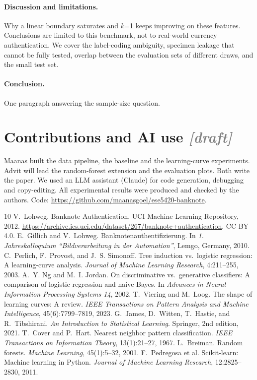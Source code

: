 \documentclass{article}
\newcommand{\todo}[1]{\textcolor{gray}{\textit{[#1]}}}
\begin{document}
\paragraph{Discussion and limitations.} Why a linear boundary saturates and $k$=1 keeps improving on these features. Conclusions are limited to this benchmark, not to real-world currency authentication. We cover the label-coding ambiguity, specimen leakage that cannot be fully tested, overlap between the evaluation sets of different draws, and the small test set.
\paragraph{Conclusion.} One paragraph answering the sample-size question.

\section*{Contributions and AI use \todo{draft}}
Maanas built the data pipeline, the baseline and the learning-curve experiments. Advit will lead the random-forest extension and the evaluation plots. Both write the paper. We used an LLM assistant (Claude) for code generation, debugging and copy-editing. All experimental results were produced and checked by the authors. Code: \url{https://github.com/maanasgoel/ese5420-banknote}.

\begin{thebibliography}{10}
 V.~Lohweg. Banknote Authentication. UCI Machine Learning Repository, 2012. \url{https://archive.ics.uci.edu/dataset/267/banknote+authentication}. CC BY 4.0.
 E.~Gillich and V.~Lohweg. Banknotenauthentifizierung. In \emph{1. Jahreskolloquium ``Bildverarbeitung in der Automation''}, Lemgo, Germany, 2010.
 C.~Perlich, F.~Provost, and J.~S. Simonoff. Tree induction vs.\ logistic regression: A learning-curve analysis. \emph{Journal of Machine Learning Research}, 4:211--255, 2003.
 A.~Y. Ng and M.~I. Jordan. On discriminative vs.\ generative classifiers: A comparison of logistic regression and naive Bayes. In \emph{Advances in Neural Information Processing Systems 14}, 2002.
 T.~Viering and M.~Loog. The shape of learning curves: A review. \emph{IEEE Transactions on Pattern Analysis and Machine Intelligence}, 45(6):7799--7819, 2023.
 G.~James, D.~Witten, T.~Hastie, and R.~Tibshirani. \emph{An Introduction to Statistical Learning}. Springer, 2nd edition, 2021.
 T.~Cover and P.~Hart. Nearest neighbor pattern classification. \emph{IEEE Transactions on Information Theory}, 13(1):21--27, 1967.
 L.~Breiman. Random forests. \emph{Machine Learning}, 45(1):5--32, 2001.
 F.~Pedregosa et al. Scikit-learn: Machine learning in Python. \emph{Journal of Machine Learning Research}, 12:2825--2830, 2011.
\end{thebibliography}
\end{document}
